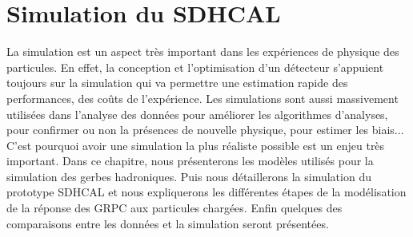 \chapter{Simulation du SDHCAL}
\label{chap.simulation}
La simulation est un aspect très important dans les expériences de physique des particules. En effet, la conception et l'optimisation d'un détecteur s'appuient toujours sur la simulation qui va permettre une estimation rapide des performances, des coûts de l'expérience. Les simulations sont aussi massivement utilisées dans l'analyse des données pour améliorer les algorithmes d'analyses, pour confirmer ou non la présences de nouvelle physique, pour estimer les biais... C'est pourquoi avoir une simulation la plus réaliste possible est un enjeu très important. Dans ce chapitre, nous présenterons les modèles utilisés pour la simulation des gerbes hadroniques. Puis nous détaillerons la simulation du prototype SDHCAL et nous expliquerons les différentes étapes de la modélisation de la réponse des GRPC aux particules chargées. Enfin quelques des comparaisons entre les données et la simulation seront présentées. 
\minitoc
\newpage


